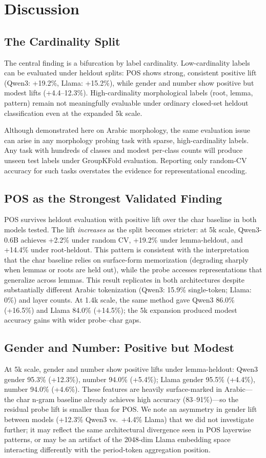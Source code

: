 \documentclass[11pt,a4paper]{article}
\begin{document}
\section{Discussion}\label{sec:discussion}

\subsection{The Cardinality Split}
The central finding is a bifurcation by label cardinality. Low-cardinality labels can be evaluated under heldout splits: POS shows strong, consistent positive lift (Qwen3: +19.2\%, Llama: +15.2\%), while gender and number show positive but modest lifts (+4.4--12.3\%). High-cardinality morphological labels (root, lemma, pattern) remain not meaningfully evaluable under ordinary closed-set heldout classification even at the expanded 5k scale.

Although demonstrated here on Arabic morphology, the same evaluation issue can arise in any morphology probing task with sparse, high-cardinality labels. Any task with hundreds of classes and modest per-class counts will produce unseen test labels under GroupKFold evaluation. Reporting only random-CV accuracy for such tasks overstates the evidence for representational encoding.

\subsection{POS as the Strongest Validated Finding}
POS survives heldout evaluation with positive lift over the char baseline in both models tested. The lift \textit{increases} as the split becomes stricter: at 5k scale, Qwen3-0.6B achieves +2.2\% under random CV, +19.2\% under lemma-heldout, and +14.4\% under root-heldout. This pattern is consistent with the interpretation that the char baseline relies on surface-form memorization (degrading sharply when lemmas or roots are held out), while the probe accesses representations that generalize across lemmas. This result replicates in both architectures despite substantially different Arabic tokenization (Qwen3: 15.9\% single-token; Llama: 0\%) and layer counts. At 1.4k scale, the same method gave Qwen3 86.0\% (+16.5\%) and Llama 84.0\% (+14.5\%); the 5k expansion produced modest accuracy gains with wider probe--char gaps.

\subsection{Gender and Number: Positive but Modest}
At 5k scale, gender and number show positive lifts under lemma-heldout: Qwen3 gender 95.3\% (+12.3\%), number 94.0\% (+5.4\%); Llama gender 95.5\% (+4.4\%), number 94.0\% (+4.6\%). These features are heavily surface-marked in Arabic---the char n-gram baseline already achieves high accuracy (83--91\%)---so the residual probe lift is smaller than for POS. We note an asymmetry in gender lift between models (+12.3\% Qwen3 vs.\ +4.4\% Llama) that we did not investigate further; it may reflect the same architectural divergence seen in POS layerwise patterns, or may be an artifact of the 2048-dim Llama embedding space interacting differently with the period-token aggregation position.
\end{document}
